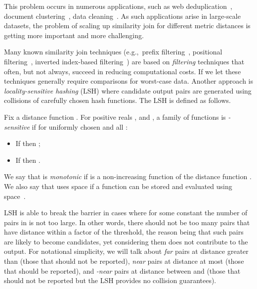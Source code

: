 \documentclass{llncs}
\begin{document}
This problem occurs in numerous applications, such as web deduplication~\cite{Bayardo_WWW07,Henzinger_SIGIR06,Xiao_WWW08}, document clustering~\cite{Broder_NETWORK97}, data cleaning~\cite{Arasu_VLDB06,Chaudhuri_ICDE06}. 
As such applications arise in large-scale datasets, the problem of scaling up similarity join for different metric distances is getting more important and more challenging.


Many known similarity join techniques (e.g.,~prefix filtering~\cite{Arasu_VLDB06,Chaudhuri_ICDE06}, positional filtering~\cite{Xiao_WWW08}, inverted index-based filtering~\cite{Bayardo_WWW07}) are based on \emph{filtering} techniques that often, but not always, succeed in reducing computational costs.
If we let  these techniques generally require  comparisons for worst-case data.
Another  approach is \emph{locality-sensitive hashing} (LSH) where candidate output pairs are generated using collisions of carefully chosen hash functions. The LSH is defined as follows.
\begin{definition}\label{def:LSH}
Fix a distance function .
For positive reals , and , a family of functions  is \emph{-sensitive} if for uniformly chosen  and all :
\begin{itemize}
	\item If  then ;
	\item If  then .
\end{itemize}
We say that  is \textit{monotonic} if  is a non-increasing function of the distance function .
We also say that  uses space  if a function  can be stored and evaluated using space~.
\end{definition}

LSH is able to break the  barrier in cases where for some constant  the number of pairs in  is not too large.
In other words, there should not be too many pairs that have distance within a factor  of the threshold, the reason being that such pairs are likely to become candidates, yet considering them does not contribute to the output.
For notational simplicity, we will talk about \emph{far} pairs at distance
greater than  (those that should not be reported), \emph{near} pairs at
distance at most  (those that should be reported), and \emph{-near} pairs
at distance between  and  (those that should not be reported but the
LSH provides no collision guarantees).

\smallskip
\end{document}
